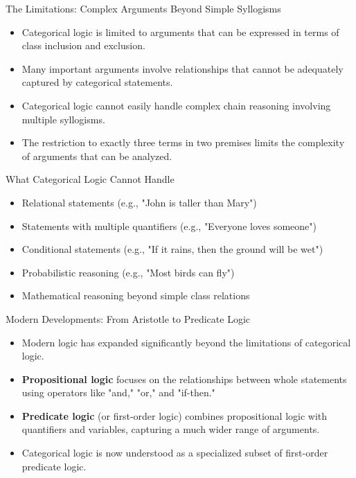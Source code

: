 \documentclass{beamer}
\begin{document}
	\begin{frame}{The Limitations: Complex Arguments Beyond Simple Syllogisms}
		\begin{itemize}
			\item Categorical logic is limited to arguments that can be expressed in terms of class inclusion and exclusion.
			\item Many important arguments involve relationships that cannot be adequately captured by categorical statements.
			\item Categorical logic cannot easily handle complex chain reasoning involving multiple syllogisms.
			\item The restriction to exactly three terms in two premises limits the complexity of arguments that can be analyzed.
		\end{itemize}
		
		\begin{alertblock}{What Categorical Logic Cannot Handle}
			\scriptsize
			\begin{itemize}
				\item Relational statements (e.g., "John is taller than Mary")
				\item Statements with multiple quantifiers (e.g., "Everyone loves someone")
				\item Conditional statements (e.g., "If it rains, then the ground will be wet")
				\item Probabilistic reasoning (e.g., "Most birds can fly")
				\item Mathematical reasoning beyond simple class relations
			\end{itemize}
		\end{alertblock}
	\end{frame}
	
	\begin{frame}{Modern Developments: From Aristotle to Predicate Logic}
		\begin{itemize}
			\item Modern logic has expanded significantly beyond the limitations of categorical logic.
			\item \textbf{Propositional logic} focuses on the relationships between whole statements using operators like "and," "or," and "if-then."
			\item \textbf{Predicate logic} (or first-order logic) combines propositional logic with quantifiers and variables, capturing a much wider range of arguments.
			\item Categorical logic is now understood as a specialized subset of first-order predicate logic.
		\end{itemize}
		
		\begin{center}
		\end{center}
	\end{frame}
	
\end{document}
